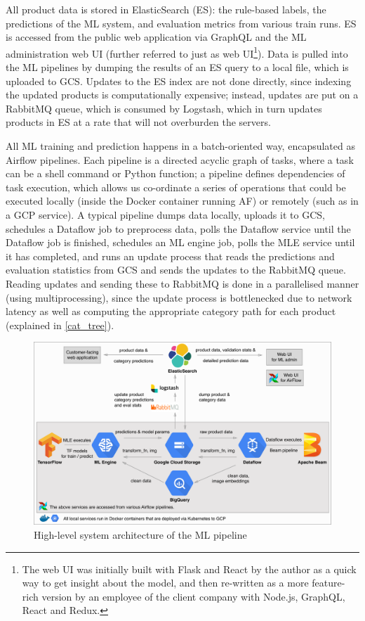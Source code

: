 All product data is stored in ElasticSearch (ES): the rule-based labels, the predictions of the ML system, and evaluation metrics from various train runs.
ES is accessed from the public web application via GraphQL and the ML administration web UI (further referred to just as web UI\footnote{The web UI was initially built with Flask and React by the author as a quick way to get insight about the model, and then re-written as a more feature-rich version by an employee of the client company with Node.js, GraphQL, React and Redux.}).
Data is pulled into the ML pipelines by dumping the results of an ES query to a local file, which is uploaded to GCS.
Updates to the ES index are not done directly, since indexing the updated products is computationally expensive; instead, updates are put on a RabbitMQ queue, which is consumed by Logstash, which in turn updates products in ES at a rate that will not overburden the servers.

All ML training and prediction happens in a batch-oriented way, encapsulated as Airflow pipelines.
Each pipeline is a directed acyclic graph of tasks, where a task can be a shell command or Python function; a pipeline defines dependencies of task execution, which allows us co-ordinate a series of operations that could be executed locally (inside the Docker container running AF) or remotely (such as in a GCP service).
A typical pipeline dumps data locally, uploads it to GCS, schedules a Dataflow job to preprocess data, polls the Dataflow service until the Dataflow job is finished, schedules an ML engine job, polls the MLE service until it has completed, and runs an update process that reads the predictions and evaluation statistics from GCS and sends the updates to the RabbitMQ queue.
Reading updates and sending these to RabbitMQ is done in a parallelised manner (using multiprocessing), since the update process is bottlenecked due to network latency as well as computing the appropriate category path for each product (explained in \ref{cat_tree}).

\begin{figure}
  \hspace*{-0.2\textwidth}
  \includegraphics[width=1.4\textwidth]{diagrams/architecture}
  \caption{High-level system architecture of the ML pipeline}
  \label{arch_diagram}
\end{figure}

